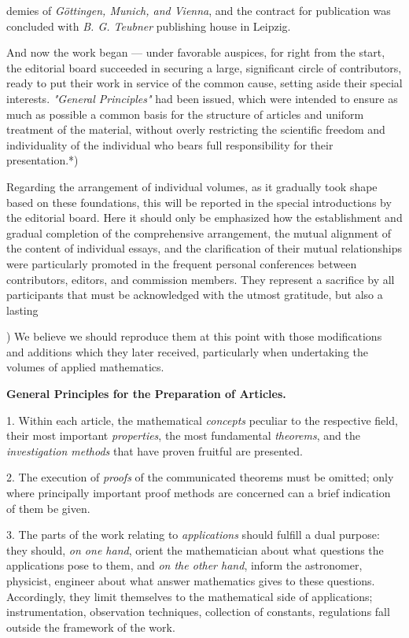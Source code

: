 \thispagestyle{fancy}

\vspace{0.5cm}

demies of \textit{Göttingen, Munich, and Vienna}, and the contract for publication was concluded with \textit{B. G. Teubner} publishing house in Leipzig.

And now the work began — under favorable auspices, for right from the start, the editorial board succeeded in securing a large, significant circle of contributors, ready to put their work in service of the common cause, setting aside their special interests. \textit{"General Principles"} had been issued, which were intended to ensure as much as possible a common basis for the structure of articles and uniform treatment of the material, without overly restricting the scientific freedom and individuality of the individual who bears full responsibility for their presentation.*)

Regarding the arrangement of individual volumes, as it gradually took shape based on these foundations, this will be reported in the special introductions by the editorial board. Here it should only be emphasized how the establishment and gradual completion of the comprehensive arrangement, the mutual alignment of the content of individual essays, and the clarification of their mutual relationships were particularly promoted in the frequent personal conferences between contributors, editors, and commission members. They represent a sacrifice by all participants that must be acknowledged with the utmost gratitude, but also a lasting

\vfill
\leftline{\rule{2in}{0.4pt}}
\vspace{0.2cm}
{\footnotesize *) We believe we should reproduce them at this point with those modifications and additions which they later received, particularly when undertaking the volumes of applied mathematics.

\vspace{0.25cm}
\textbf{General Principles for the Preparation of Articles.}
\vspace{0.25cm}

1. Within each article, the mathematical \textit{concepts} peculiar to the respective field, their most important \textit{properties}, the most fundamental \textit{theorems}, and the \textit{investigation methods} that have proven fruitful are presented.

2. The execution of \textit{proofs} of the communicated theorems must be omitted; only where principally important proof methods are concerned can a brief indication of them be given.

3. The parts of the work relating to \textit{applications} should fulfill a dual purpose: they should, \textit{on one hand}, orient the mathematician about what questions the applications pose to them, and \textit{on the other hand}, inform the astronomer, physicist, engineer about what answer mathematics gives to these questions. Accordingly, they limit themselves to the mathematical side of applications; instrumentation, observation techniques, collection of constants, regulations fall outside the framework of the work.

}

